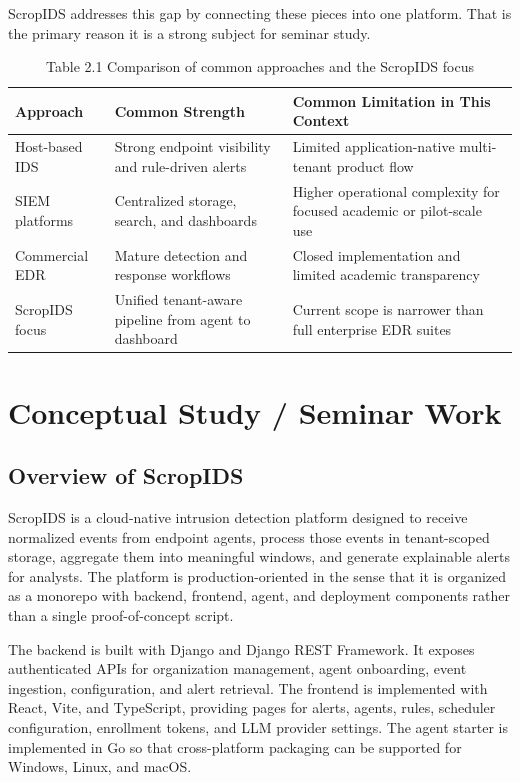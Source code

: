 \documentclass[12pt,a4paper]{report}
\begin{document}
ScropIDS addresses this gap by connecting these pieces into one platform. That is the primary reason it is a strong subject for seminar study.

\begin{table}[H]
\centering
\caption{Table 2.1 Comparison of common approaches and the ScropIDS focus}
\begin{tabularx}{\textwidth}{>{\raggedright\arraybackslash}p{1.8in} X X}
\toprule
\textbf{Approach} & \textbf{Common Strength} & \textbf{Common Limitation in This Context} \\
\midrule
Host-based IDS & Strong endpoint visibility and rule-driven alerts & Limited application-native multi-tenant product flow \\
SIEM platforms & Centralized storage, search, and dashboards & Higher operational complexity for focused academic or pilot-scale use \\
Commercial EDR & Mature detection and response workflows & Closed implementation and limited academic transparency \\
ScropIDS focus & Unified tenant-aware pipeline from agent to dashboard & Current scope is narrower than full enterprise EDR suites \\
\bottomrule
\end{tabularx}
\end{table}

\chapter{Conceptual Study / Seminar Work}

\section{Overview of ScropIDS}
ScropIDS is a cloud-native intrusion detection platform designed to receive normalized events from endpoint agents, process those events in tenant-scoped storage, aggregate them into meaningful windows, and generate explainable alerts for analysts. The platform is production-oriented in the sense that it is organized as a monorepo with backend, frontend, agent, and deployment components rather than a single proof-of-concept script.

The backend is built with Django and Django REST Framework. It exposes authenticated APIs for organization management, agent onboarding, event ingestion, configuration, and alert retrieval. The frontend is implemented with React, Vite, and TypeScript, providing pages for alerts, agents, rules, scheduler configuration, enrollment tokens, and LLM provider settings. The agent starter is implemented in Go so that cross-platform packaging can be supported for Windows, Linux, and macOS.
\end{document}
